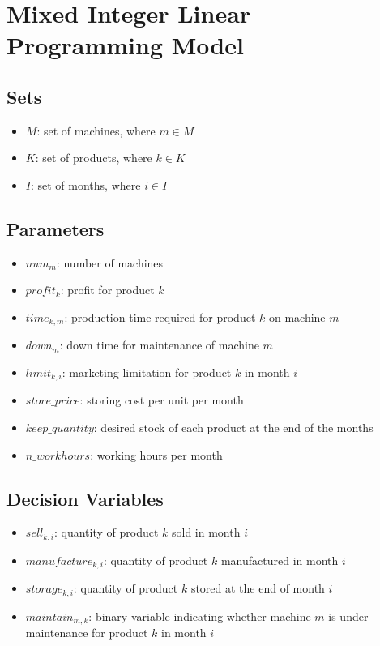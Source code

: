 \documentclass{article}
\begin{document}
\section*{Mixed Integer Linear Programming Model}

\subsection*{Sets}
\begin{itemize}
    \item $M$: set of machines, where $m \in M$
    \item $K$: set of products, where $k \in K$
    \item $I$: set of months, where $i \in I$
\end{itemize}

\subsection*{Parameters}
\begin{itemize}
    \item $num_m$: number of machines
    \item $profit_k$: profit for product $k$
    \item $time_{k,m}$: production time required for product $k$ on machine $m$
    \item $down_m$: down time for maintenance of machine $m$
    \item $limit_{k,i}$: marketing limitation for product $k$ in month $i$
    \item $store\_price$: storing cost per unit per month
    \item $keep\_quantity$: desired stock of each product at the end of the months
    \item $n\_workhours$: working hours per month 
\end{itemize}

\subsection*{Decision Variables}
\begin{itemize}
    \item $sell_{k,i}$: quantity of product $k$ sold in month $i$
    \item $manufacture_{k,i}$: quantity of product $k$ manufactured in month $i$
    \item $storage_{k,i}$: quantity of product $k$ stored at the end of month $i$
    \item $maintain_{m,k}$: binary variable indicating whether machine $m$ is under maintenance for product $k$ in month $i$
\end{itemize}
\end{document}
